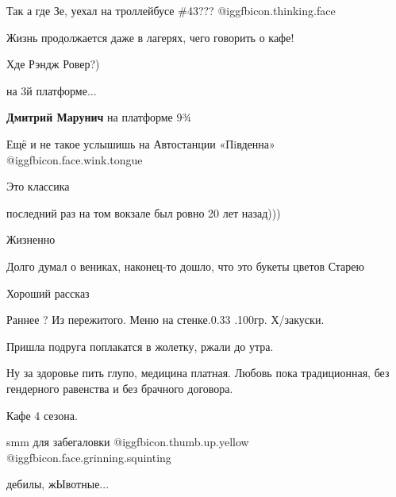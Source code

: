 \begin{itemize}
Так а где Зе, уехал на троллейбусе \#43??? @igg{fbicon.thinking.face} 

Жизнь продолжается даже в лагерях, чего говорить о кафе!

Хде Рэндж Ровер?)

на 3й платформе...

\textbf{Дмитрий Марунич} на платформе 9¾

Ещё и не такое услышишь на Автостанции «Пiвденна»  @igg{fbicon.face.wink.tongue} 

Это классика

последний раз на том вокзале был ровно 20 лет назад)))

Жизненно

Долго думал о вениках, наконец-то дошло, что это букеты цветов
Старею

Хороший рассказ

Раннее ? Из пережитого. Меню на стенке.0.33 .100гр. Х/закуски.

Пришла подруга поплакатся в жолетку, ржали до утра.

Ну за здоровье пить глупо, медицина платная. Любовь пока традиционная, без
гендерного равенства и без брачного договора.

Кафе 4 сезона.

smm для забегаловки  @igg{fbicon.thumb.up.yellow}  @igg{fbicon.face.grinning.squinting} 

дебилы, жЫвотные...




\end{itemize} %

